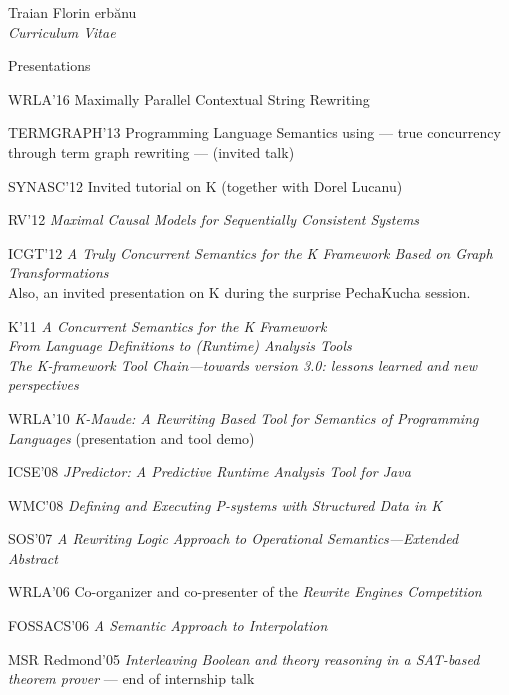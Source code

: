 \documentclass[10pt]{article}
\newcommand{\Sh}{\unichar{0536}}
\newcommand{\tz}{\unichar{0539}}
\newcommand{\Serbanuta}{{\Sh}er\-b{\u a}\-nu\-{\tz}{\u a}}
\begin{document}
\begin{cv}{Traian Florin \Serbanuta{}\\{\large \itshape Curriculum Vitae}}
\begin{cvlist}{Presentations}
\item[WRLA'16] Maximally Parallel Contextual String Rewriting
\item[TERMGRAPH'13] Programming Language Semantics using --- true concurrency through term graph rewriting --- (invited talk)
\item[SYNASC'12] Invited tutorial on K (together with Dorel Lucanu)
\item[RV'12]  \textit{Maximal Causal Models for Sequentially Consistent Systems}
\item[ICGT'12] \textit{A Truly Concurrent Semantics for the K Framework Based on
               Graph Transformations}
               \\
               Also, an invited presentation on K during the surprise PechaKucha session.
\item[K'11] \textit{A Concurrent Semantics for the K Framework}
\\ \textit{From Language Definitions to (Runtime) Analysis Tools}
\\ \textit{The K-framework Tool Chain---towards version 3.0: lessons learned and new perspectives}
\item[WRLA'10] \textit{K-Maude: A Rewriting Based Tool for Semantics of Programming Languages} (presentation and tool demo)
\item[ICSE'08] \textit{JPredictor: A Predictive Runtime Analysis Tool for Java}
\item[WMC'08] \textit{Defining and Executing P-systems with Structured Data in K}
\item[SOS'07] \textit{A Rewriting Logic Approach to Operational Semantics---Extended Abstract}
\item[WRLA'06] Co-organizer and co-presenter of the \textit{Rewrite Engines Competition}
\item[FOSSACS'06] \textit{A Semantic Approach to Interpolation}
\item[MSR Redmond'05] \textit{Interleaving Boolean and theory reasoning in a SAT-based theorem prover} --- end of internship talk
\end{cvlist}

\setlength{\cvlabelwidth}{1em}

%


\end{cv}
\end{document}
